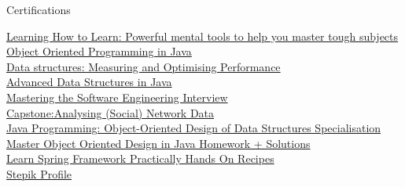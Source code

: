 \documentclass{resume} %
\begin{document}
\begin{rSection}{Certifications}

\href{https://www.coursera.org/account/accomplishments/verify/W8EXDYYYEVQU}{Learning How to Learn: Powerful mental tools to help you master tough subjects} \\
\href{https://www.coursera.org/account/accomplishments/verify/UL8495ETRA74}{Object Oriented Programming in Java} \\
\href{https://www.coursera.org/account/accomplishments/verify/CBLS952ZRT4Q}{Data structures: Measuring and Optimising Performance} \\
\href{https://www.coursera.org/account/accomplishments/verify/LN3AZ7DBPR66}{Advanced Data Structures in Java} \\
\href{https://www.coursera.org/account/accomplishments/verify/K3T33584K6EE}{Mastering the Software Engineering Interview} \\
\href{https://www.coursera.org/account/accomplishments/verify/LY7LV3DC8XGX}{Capstone:Analysing (Social) Network Data} \\
\href{https://www.coursera.org/account/accomplishments/specialization/Q43UK3TYBDBT}{Java Programming: Object-Oriented Design of Data Structures Specialisation} \\
\href{https://www.udemy.com/certificate/UC-94P2RWQ1/}{Master Object Oriented Design in Java \- Homework + Solutions} \\
\href{https://www.udemy.com/certificate/UC-WQZIGC8O/}{Learn Spring Framework Practically \- Hands On Recipes} \\
\href{https://stepik.org/users/30653559}{Stepik Profile}

\end{rSection}


\end{document}
